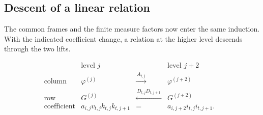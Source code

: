 

\subsection{Descent of a linear relation}

The common frames and the finite measure factors now enter the same induction. With the indicated coefficient change, a relation at the higher level descends through the two lifts.

\begin{construction}
\[
 \begin{array}{rcccl}
  &\text{level }j&&\text{level }j+2&\\[2pt]
 \text{column}&\varphi^{(j)}&\xrightarrow{\ A_{t,j}\ }&
                           \varphi^{(j+2)}&\\[2pt]
 \text{row}&G^{(j)}&\xleftarrow{\ D_{t,j}D_{t,j+1}\ }&
                           G^{(j+2)}&\\[3pt]
 \text{coefficient}&a_{i,j}v_{t,j}k_{t,j}k_{t,j+1}
          &=&a_{i,j+2}i_{t,j}i_{t,j+1}.&
 \end{array}
\]
\caption{One even step in Lemma~\ref{lem:joint-period}, with \(t=t_i\). The column moves up and the row moves down. The bottom equality permits the weighted relation at level \(j+2\) to descend.}\label{fig:even-period-step}
\end{construction}

